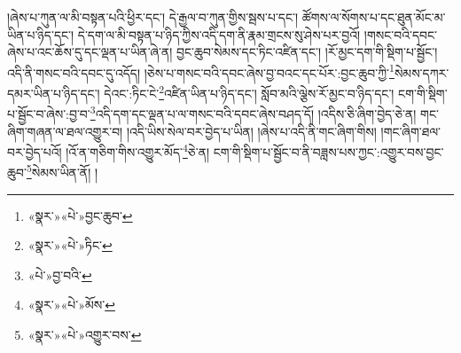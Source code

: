 །ཞེས་པ་ཀུན་ལ་མི་བསྟན་པའི་ཕྱིར་དང་། དེ་རྒྱལ་བ་ཀུན་གྱིས་སྦས་པ་དང་། ཚོགས་ལ་སོགས་པ་དང་ཐུན་མོང་མ་ཡིན་པ་ཉིད་དང་། དེ་དག་ལ་མི་བསྟན་པ་ཉིད་ཀྱིས་འདི་དག་ནི་རྣམ་གྲངས་སུ་ཤེས་པར་བྱའོ། །གསང་བའི་དབང་ཞེས་པ་འང་ཆོས་དུ་དང་ལྡན་པ་ཡིན་ཞེ་ན། བྱང་ཆུབ་སེམས་དང་ཏིང་འཛིན་དང་། །རོ་མྱང་དག་གི་སྡིག་པ་སྦྱོང་། འདི་ནི་གསང་བའི་དབང་དུ་འདོད། །ཅེས་པ་གསང་བའི་དབང་ཞེས་བྱ་བའང་དང་པོར་:བྱང་ཆུབ་ཀྱི་\footnote{«སྣར་»«པེ་»བྱང་ཆུབ་}སེམས་དཀར་དམར་ཡིན་པ་ཉིད་དང་། དེའང་:ཏིང་ངེ་\footnote{«སྣར་»«པེ་»ཏིང་}འཛིན་ཡིན་པ་ཉིད་དང་། སློབ་མའི་ལྕེས་རོ་མྱང་བ་ཉིད་དང་། ངག་གི་སྡིག་པ་སྦྱོང་བ་ཞེས་:བྱ་བ་\footnote{«པེ་»བྱ་བའི་}འདི་དག་དང་ལྡན་པ་ལ་གསང་བའི་དབང་ཞེས་བཤད་དོ། །འདིས་ཅི་ཞིག་བྱེད་ཅེ་ན། གང་ཞིག་གཞན་ལ་ཐལ་འགྱུར་བ། །འདི་ཡིས་སེལ་བར་བྱེད་པ་ཡིན། །ཞེས་པ་འདི་ནི་གང་ཞིག་གིས། །གང་ཞིག་ཐལ་བར་བྱེད་པའོ། །འོ་ན་གཅིག་གིས་འགྱུར་མོད་\footnote{«སྣར་»«པེ་»མོས་}ཅེ་ན། ངག་གི་སྡིག་པ་སྦྱོང་བ་ནི་བཟླས་པས་ཀྱང་:འགྱུར་བས་བྱང་ཆུབ་\footnote{«སྣར་»«པེ་»འགྱུར་བས་}སེམས་ཡིན་ནོ། །
